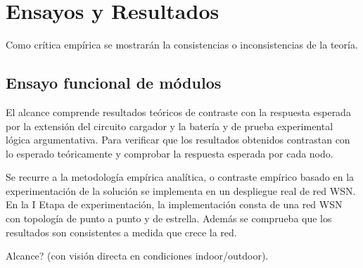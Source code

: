 
\chapter{Ensayos y Resultados} %

\label{Chapter4} %


Como crítica empírica se mostrarán la consistencias o inconsistencias de la teoría.

%
%

\section{Ensayo funcional de módulos}
\label{sec:funcional}

El alcance comprende resultados teóricos de contraste con la respuesta esperada por la extensión del circuito cargador y la batería y de prueba experimental lógica argumentativa. Para verificar que los resultados obtenidos contrastan con lo esperado teóricamente y comprobar la respuesta esperada por cada nodo.

Se recurre a la metodología empírica analítica, o contraste empírico basado en la experimentación de la solución se implementa en un despliegue real de red WSN. En la I Etapa de experimentación, la implementación consta de una red WSN con topología de punto a punto y de estrella. Además se comprueba que los resultados son consistentes a medida que crece la red.

Alcance? (con visión directa en condiciones indoor/outdoor).

